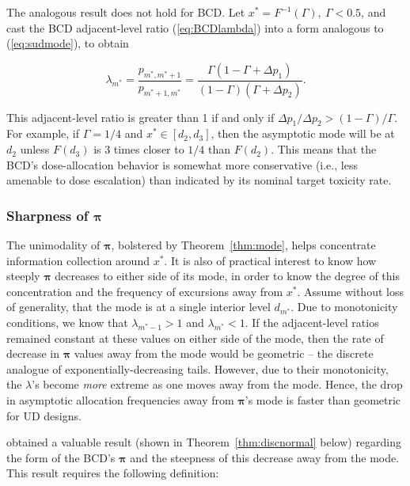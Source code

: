 The analogous result does not hold for BCD. Let $x^*=F^{-1}(\Gamma),\ \Gamma<0.5$, and cast the BCD adjacent-level ratio (\ref{eq:BCDlambda}) into a form analogous to (\ref{eq:sudmode}), to obtain

\begin{equation*}
\lambda_{m^*}=\frac{p_{m^*,m^*+1}}{p_{m^*+1,m^*}}=\frac{\Gamma\left(1-\Gamma+\Delta p_1\right)}{(1-\Gamma)\left(\Gamma+\Delta p_2\right)}.
\end{equation*}

\noindent This adjacent-level ratio is greater than 1 if and only if $\Delta p_1/\Delta p_2>(1-\Gamma)/\Gamma$. For example, if $\Gamma=1/4$ and $x^*\in\left[d_2,d_3\right]$, then the asymptotic mode will be at $d_2$ unless $F\left(d_3\right)$ is 3 times closer to $1/4$ than $F\left(d_2\right)$. This means that the BCD's dose-allocation behavior is somewhat more conservative (i.e., less amenable to dose escalation) than indicated by its nominal target toxicity rate.

\subsubsection{Sharpness of $\boldsymbol{\pi}$}

The unimodality of $\boldsymbol{\pi}$, bolstered by Theorem~\ref{thm:mode}, helps concentrate information collection around $x^*$. It is also of practical interest to know how steeply $\boldsymbol{\pi}$ decreases to either side of its mode, in order to know the degree of this concentration and the frequency of excursions away from $x^*$. Assume without loss of generality, that the mode is at a single interior level $d_{m^*}$. Due to monotonicity conditions, we know that $\lambda_{m^*-1}>1$ and $\lambda_{m^*}<1$. If the adjacent-level ratios remained constant at these values on either side of the mode, then the rate of decrease in $\boldsymbol{\pi}$ values away from the mode would be geometric -- the discrete analogue of exponentially-decreasing tails. However, due to their monotonicity, the $\lambda$'s become \emph{more} extreme as one moves away from the mode. Hence, the drop in asymptotic allocation frequencies away from $\boldsymbol{\pi}$'s mode is faster than geometric for UD designs.

\cite{Durh:Flou:rand:1994} obtained a valuable result (shown in Theorem~\ref{thm:discnormal} below) regarding the form of the BCD's $\boldsymbol{\pi}$ and the steepness of this decrease away from the mode. This result requires the following definition:

